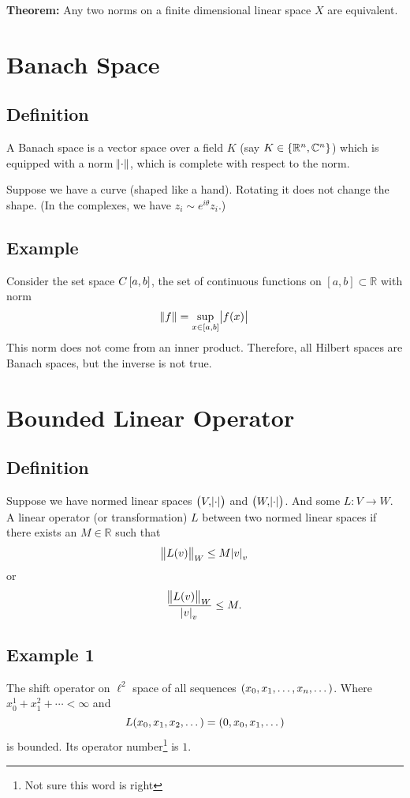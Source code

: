 \documentclass{article}
\newcommand{\RR}{\mathbb{R}}
\newcommand{\CC}{\mathbb{C}}
\begin{document}
\textbf{Theorem:} Any two norms on a finite dimensional linear space \(X\) are equivalent.

\section{Banach Space}

\subsection{Definition}
A Banach space is a vector space over a field \(K\) (say \(K \in \set{\RR^n, \CC^n}\)) which is equipped with a norm \(\norm{\cdot}\), which is complete with respect to the norm.

Suppose we have a curve (shaped like a hand).
Rotating it does not change the shape. (In the complexes, we have \(z_i \sim e^{i\theta}z_i\).)

\subsection{Example}

Consider the set space \(C\intcc{a, b}\), the set of continuous functions on \([a, b] \subset \RR\) with norm
\[\norm{f} = \sup_{x \in \intcc{a, b}} \abs{f(x)}\]
This norm does not come from an inner product.
Therefore, all Hilbert spaces are Banach spaces, but the inverse is not true.

\section{Bounded Linear Operator}

\subsection{Definition}

Suppose we have normed linear spaces \(\del{V, \abs{\cdot}}\) and \(\del{W, \abs{\cdot}}\).
And some \(L: V \to W\).
A linear operator (or transformation) \(L\) between two normed linear spaces if there exists an \(M \in \RR\) such that
\[\norm{L(v)}_{W} \leq M \abs{v}_v\]
or
\[\frac{\norm{L(v)}_W}{\abs{v}_v} \leq M.\]

\subsection{Example 1}

The shift operator on \(\ell^2\) space of all sequences \(\del{x_0, x_1, \dots, x_n, \dots}\).
Where \(x_0^1 + x_1^2 + \cdots < \infty\) and
\[L(x_0, x_1, x_2, \dots) = \del{0, x_0, x_1, \dots}\]
is bounded. Its operator number\footnote{Not sure this word is right} is \(1\).
\end{document}
